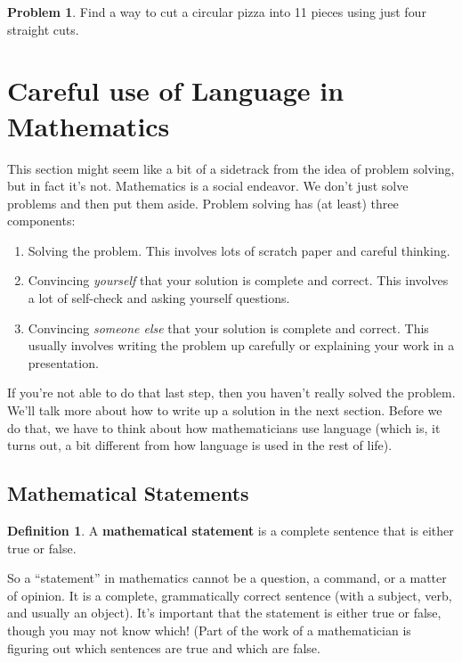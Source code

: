 \documentclass[10pt, reqno]{amsart}
\theoremstyle{remark}
\theoremstyle{definition}
\newtheorem{define}[thm]{Definition}
\newtheorem{problem}{Problem}
\numberwithin{equation}{section}  %
\begin{document}
\begin{problem}
Find a way to cut a circular pizza into 11 pieces using just four straight cuts.
\end{problem}



\section{Careful use of Language in Mathematics}
This section might seem like a bit of a sidetrack from the idea of problem solving, but in fact it's not.  Mathematics is a social endeavor.  We don't just solve problems and then put them aside.  Problem solving has (at least) three components:
\begin{enumerate}
\item
Solving the problem.  This involves lots of scratch paper and careful thinking.
\item
Convincing \emph{yourself} that your solution is complete and correct.  This involves a lot of self-check and asking yourself questions.
\item
Convincing \emph{someone else} that your solution is complete and correct.  This usually involves writing the problem up carefully or explaining your work in a presentation.
\end{enumerate}

If you're not able to do that last step, then you haven't really solved the problem.  We'll talk more about how to write up a solution in the next section.  Before we do that, we have to think about how mathematicians use language (which is, it turns out, a bit different from how language is used in the rest of life).

\subsection{Mathematical Statements}

\begin{define}
A {\bf mathematical statement} is a complete sentence that is either true or false.
\end{define}

So a ``statement'' in mathematics cannot be a question, a command, or a matter of opinion.  It is a complete, grammatically correct sentence (with a subject, verb, and usually an object).  It's important that the statement is either true or false, though you may not know which!  (Part of the work of a mathematician is figuring out which sentences are true and which are false.
\end{document}
